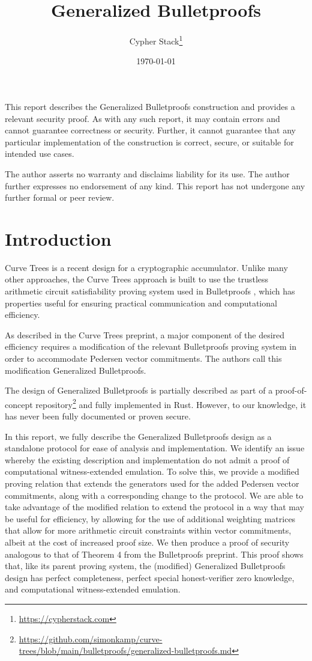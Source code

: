 \documentclass{article}
\title{Generalized Bulletproofs}
\author{Cypher Stack\thanks{\url{https://cypherstack.com}}}
\date{\today}
\begin{document}
\maketitle

This report describes the Generalized Bulletproofs construction and provides a relevant security proof.
As with any such report, it may contain errors and cannot guarantee correctness or security.
Further, it cannot guarantee that any particular implementation of the construction is correct, secure, or suitable for intended use cases.

The author asserts no warranty and disclaims liability for its use.
The author further expresses no endorsement of any kind.
This report has not undergone any further formal or peer review.

\tableofcontents


\section{Introduction}

Curve Trees \cite{curvetrees} is a recent design for a cryptographic accumulator.
Unlike many other approaches, the Curve Trees approach is built to use the trustless arithmetic circuit satisfiability proving system used in Bulletproofs \cite{bp}, which has properties useful for ensuring practical communication and computational efficiency.

As described in the Curve Trees preprint, a major component of the desired efficiency requires a modification of the relevant Bulletproofs proving system in order to accommodate Pedersen vector commitments.
The authors call this modification Generalized Bulletproofs.

The design of Generalized Bulletproofs is partially described as part of a proof-of-concept repository\footnote{\url{https://github.com/simonkamp/curve-trees/blob/main/bulletproofs/generalized-bulletproofs.md}} and fully implemented in Rust.
However, to our knowledge, it has never been fully documented or proven secure.

In this report, we fully describe the Generalized Bulletproofs design as a standalone protocol for ease of analysis and implementation.
We identify an issue whereby the existing description and implementation do not admit a proof of computational witness-extended emulation.
To solve this, we provide a modified proving relation that extends the generators used for the added Pedersen vector commitments, along with a corresponding change to the protocol.
We are able to take advantage of the modified relation to extend the protocol in a way that may be useful for efficiency, by allowing for the use of additional weighting matrices that allow for more arithmetic circuit constraints within vector commitments, albeit at the cost of increased proof size.
We then produce a proof of security analogous to that of Theorem 4 from the Bulletproofs preprint.
This proof shows that, like its parent proving system, the (modified) Generalized Bulletproofs design has perfect completeness, perfect special honest-verifier zero knowledge, and computational witness-extended emulation.
\end{document}
